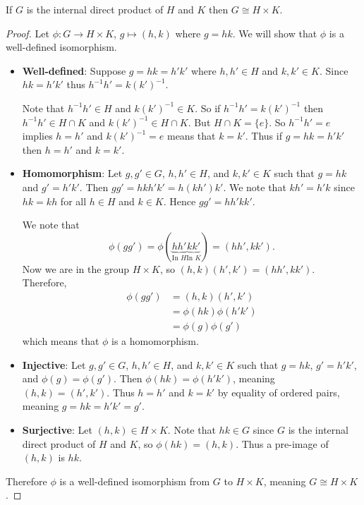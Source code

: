 \begin{theorem}\label{thrm-direct-product-equivilance}
    If $G$ is the internal direct product of $H$ and $K$ then $G \cong H \times K$.
\end{theorem}
\begin{proof}
    Let $\phi: G \to H \times K$, $g \mapsto (h, k)$ where $g = hk$. We will show that $\phi$ is a well-defined isomorphism.
    \begin{itemize}
        \item \textbf{Well-defined}: Suppose $g = hk = h'k'$ where $h, h' \in H$ and $k, k' \in K$. Since $hk = h'k'$ thus $h^{-1}h' = k(k')^{-1}$.

        Note that $h^{-1}h' \in H$ and $k(k')^{-1} \in K$. So if $h^{-1}h' = k(k')^{-1}$ then $h^{-1}h' \in H \cap K$ and $k(k')^{-1} \in H \cap K$. But $H \cap K = \{e\}$. So $h^{-1}h' = e$ implies $h = h'$ and $k(k')^{-1} = e$ means that $k = k'$. Thus if $g = hk = h'k'$ then $h = h'$ and $k = k'$.
        
        \item \textbf{Homomorphism}: Let $g, g' \in G$, $h, h' \in H$, and $k, k' \in K$ such that $g = hk$ and $g' = h'k'$. Then $gg' = hkh'k' = h(kh')k'$. We note that $kh' = h'k$ since $hk = kh$ for all $h \in H$ and $k \in K$. Hence $gg' = hh'kk'$.
        
        We note that
        \[
            \phi(gg') = \phi(\underbrace{hh'}_{\text{In }H}\underbrace{kk'}_{\text{In }K}) = (hh', kk').
        \]
        Now we are in the group $H \times K$, so $(h, k)(h', k') = (hh', kk')$. Therefore,
        \begin{align*}
            \phi(gg') &= (h,k)(h',k')\\
            &= \phi(hk)\phi(h'k')\\
            &= \phi(g)\phi(g')
        \end{align*}
        which means that $\phi$ is a homomorphism.
        
        \item \textbf{Injective}: Let $g, g' \in G$, $h, h' \in H$, and $k, k' \in K$ such that $g = hk$, $g' = h'k'$, and $\phi(g) = \phi(g')$. Then $\phi(hk) = \phi(h'k')$, meaning $(h,k) = (h',k')$. Thus $h = h'$ and $k = k'$ by equality of ordered pairs, meaning $g = hk = h'k' = g'$.
        
        \item \textbf{Surjective}: Let $(h, k) \in H \times K$. Note that $hk \in G$ since $G$ is the internal direct product of $H$ and $K$, so $\phi(hk) = (h, k)$. Thus a pre-image of $(h, k)$ is $hk$.
    \end{itemize}
    Therefore $\phi$ is a well-defined isomorphism from $G$ to $H \times K$, meaning $G \cong H \times K$.
\end{proof}


